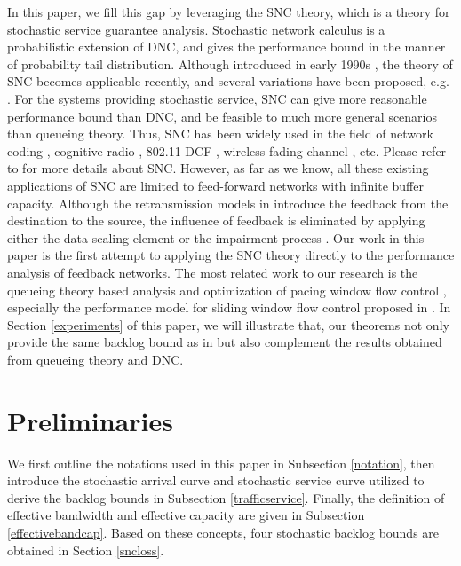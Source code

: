\documentclass[paper]{ieice}
\begin{document}
In this paper, we fill this gap by leveraging the SNC theory, which is a theory for stochastic service guarantee analysis. Stochastic network calculus is a probabilistic extension of DNC, and gives the performance bound in the manner of probability tail distribution. Although introduced in early 1990s \cite{Chan94}, the theory of SNC becomes applicable recently, and several variations have been proposed, e.g. \cite{jiang2006basic,Fidl06,5984844,Ciucu2006Scaling}. For the systems providing stochastic service, SNC can give more reasonable performance bound than DNC, and be feasible to much more general scenarios than queueing theory. Thus, SNC has been widely used in the field of network coding \cite{10.1109/TPDS.2010.192}, cognitive radio \cite{5466711}, 802.11 DCF \cite{xie2010network}\cite{wang2012effectiveness}, wireless fading channel \cite{Fidler2006network,wangperformance}, etc. Please refer to \cite{JiangLiu-15877} for more details about SNC. However, as far as we know, all these existing applications of SNC are limited to feed-forward networks with infinite buffer capacity. Although the retransmission models in \cite{wangperformance,5466711} introduce the feedback from the destination to the source, the influence of feedback is eliminated by applying either the data scaling element \cite{wangperformance} or the impairment process \cite{5466711}. Our work in this paper is the first attempt to applying the SNC theory directly to the performance analysis of feedback networks. The most related work to our research is the queueing theory based analysis and optimization of pacing window flow control \cite{jung1996analysis,1095377}, especially the performance model for sliding window flow control proposed in \cite{jung1996analysis}. In Section \ref{experiments} of this paper, we will illustrate that, our theorems not only provide the same backlog bound as in \cite{jung1996analysis} but also complement the results obtained from queueing theory and DNC.

\section{Preliminaries}\label{Notations}
We first outline the notations used in this paper in Subsection \ref{notation}, then introduce the stochastic arrival curve and stochastic service curve utilized to derive the backlog bounds in Subsection \ref{trafficservice}. Finally, the definition of effective bandwidth and effective capacity are given in Subsection \ref{effectivebandcap}. Based on these concepts, four stochastic backlog bounds are obtained in Section \ref{sncloss}.
\end{document}
